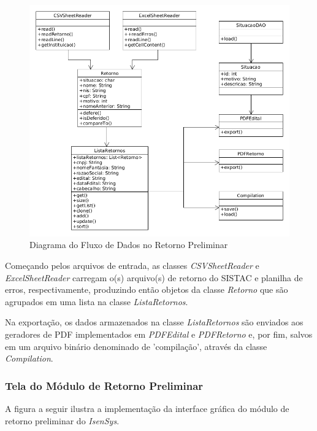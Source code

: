 \documentclass[
	12pt,			%
	openright,		%
	oneside,	
	a4paper,		%
	english,		%
	brazil			%
]{abntex2/abntex2}  %
\begin{document}
					\begin{figure}[h]
						\begin{center}
							
							\caption{Diagrama do Fluxo de Dados no Retorno Preliminar}
							\label{preliminar-fluxo}
							
							\includegraphics[scale=0.5]{img/retorno-prelim-uml}
							
						\end{center}
					\end{figure}
	
					Começando pelos arquivos de entrada, as classes \textit{CSVSheetReader} e \textit{ExcelSheetReader} carregam o(s) arquivo(s) de retorno do SISTAC e planilha de erros, respectivamente, produzindo então objetos da classe \textit{Retorno} que são agrupados em uma lista na classe \textit{ListaRetornos}.
	
					Na exportação, os dados armazenados na classe \textit{ListaRetornos} são enviados aos geradores de PDF implementados em \textit{PDFEdital} e \textit{PDFRetorno} e, por fim, salvos em um arquivo binário denominado de 'compilação', através da classe \textit{Compilation}.
	
				\subsubsection{Tela do Módulo de Retorno Preliminar}
	
					A figura a seguir ilustra a implementação da interface gráfica do módulo de retorno preliminar do \textit{IsenSys}.
	
\end{document}

